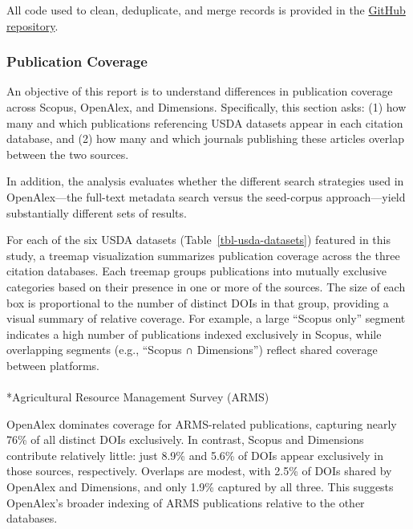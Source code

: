 \documentclass[
  letterpaper,
  DIV=11,
  numbers=noendperiod]{scrartcl}
\makeatletter
\let\oldparagraph\paragraph
\renewcommand{\paragraph}{
    \@ifstar
      \xxxParagraphStar
      \xxxParagraphNoStar
  }
\newcommand{\xxxParagraphStar}[1]{\oldparagraph*{#1}\mbox{}}
\newcommand{\xxxParagraphNoStar}[1]{\oldparagraph{#1}\mbox{}}
\makeatother
\begin{document}
All code used to clean, deduplicate, and merge records is provided in
the
\href{https://github.com/laurenchenarides/compare_scopus_openalex_report}{GitHub
repository}.

\subsubsection{Publication Coverage}\label{publication-coverage}

An objective of this report is to understand differences in publication
coverage across Scopus, OpenAlex, and Dimensions. Specifically, this
section asks: (1) how many and which publications referencing USDA
datasets appear in each citation database, and (2) how many and which
journals publishing these articles overlap between the two sources.

In addition, the analysis evaluates whether the different search
strategies used in OpenAlex---the full-text metadata search versus the
seed-corpus approach---yield substantially different sets of results.

For each of the six USDA datasets (Table~\ref{tbl-usda-datasets})
featured in this study, a treemap visualization summarizes publication
coverage across the three citation databases. Each treemap groups
publications into mutually exclusive categories based on their presence
in one or more of the sources. The size of each box is proportional to
the number of distinct DOIs in that group, providing a visual summary of
relative coverage. For example, a large ``Scopus only'' segment
indicates a high number of publications indexed exclusively in Scopus,
while overlapping segments (e.g., ``Scopus ∩ Dimensions'') reflect
shared coverage between platforms.

\paragraph*{Agricultural Resource Management Survey
(ARMS)}\label{agricultural-resource-management-survey-arms}

OpenAlex dominates coverage for ARMS-related publications, capturing
nearly 76\% of all distinct DOIs exclusively. In contrast, Scopus and
Dimensions contribute relatively little: just 8.9\% and 5.6\% of DOIs
appear exclusively in those sources, respectively. Overlaps are modest,
with 2.5\% of DOIs shared by OpenAlex and Dimensions, and only 1.9\%
captured by all three. This suggests OpenAlex's broader indexing of ARMS
publications relative to the other databases.
\end{document}
